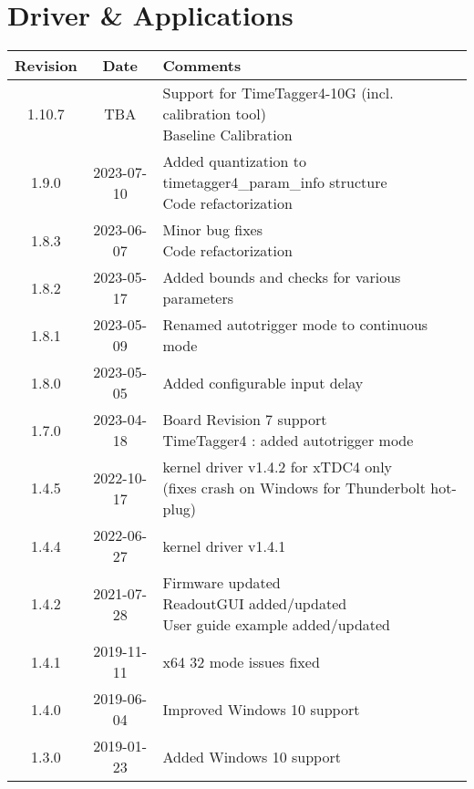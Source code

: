 \section{Driver \& Applications} \label{sec:rev_driver_applications}
\begin{tabularx}{\textwidth}{|c|c|X|}
    \hline
    Revision & Date & Comments\\
    \hline\hline
    \hypertarget{drvrev}{1.10.7} & TBA &
    \makecell[l] {
        Support for TimeTagger4-10G (incl. calibration tool)\\*
        Baseline Calibration
    }\\   
    \hline
    1.9.0 & 2023-07-10 &
    \makecell[l] {
       Added quantization to timetagger4\_param\_info structure \\*
       Code refactorization\\*   
    }\\   
    \hline
    {1.8.3} & 2023-06-07 &
    \makecell[l] {
        Minor bug fixes\\*
        Code refactorization\\*        
    }\\
    \hline
    {1.8.2} & 2023-05-17 &
    \makecell[l] {
        Added bounds and checks for various parameters\\*         
    }\\
    \hline
    {1.8.1} & 2023-05-09 &
    \makecell[l] {
     Renamed autotrigger mode to continuous mode  \\*  
    }\\
    \hline
    {1.8.0} & 2023-05-05 &
    \makecell[l] {
        Added configurable input delay\\*
    }\\
    \hline
    {1.7.0} & 2023-04-18 &
    \makecell[l] {
        Board Revision 7 support\\* 
        TimeTagger4 : added autotrigger mode\\*
    }\\
    \hline
    {1.4.5} & 2022-10-17 &
    \makecell[l] {
        kernel driver v1.4.2 for xTDC4 only\\* 
        (fixes crash on Windows for Thunderbolt hot-plug)\\*
    }\\
    \hline
    {1.4.4} & 2022-06-27 &
        kernel driver v1.4.1\\
    \hline
    1.4.2 & 2021-07-28 &
    \makecell[l]{
        Firmware updated \\*
        ReadoutGUI added/updated \\*
        User guide example added/updated \\*
    }\\
    \hline
    {1.4.1} & 2019-11-11 & x64 32 mode issues fixed\\
    \hline
    {1.4.0} & 2019-06-04 & Improved Windows 10 support\\
    \hline
    {1.3.0} & 2019-01-23 & Added Windows 10 support\\
    \hline
\end{tabularx}